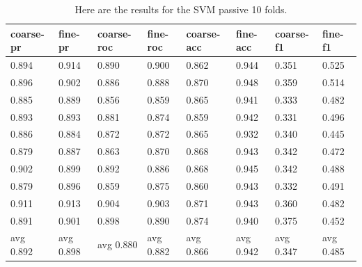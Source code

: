 \documentclass[ms]{nuthesis}
\begin{document}
\FloatBarrier
\begin{table}[H]
  \centering
  \begin{tabular}{|l||l||l||l||l||l||l||l|}\toprule
    coarse-pr & fine-pr & coarse-roc & fine-roc & coarse-acc & fine-acc & coarse-f1 & fine-f1 \\ \midrule
    0.894 & 0.914 & 0.890 & 0.900 & 0.862 & 0.944 & 0.351 & 0.525 \\
    0.896 & 0.902 & 0.886 & 0.888 & 0.870 & 0.948 & 0.359 & 0.514 \\
    0.885 & 0.889 & 0.856 & 0.859 & 0.865 & 0.941 & 0.333 & 0.482 \\
    0.893 & 0.893 & 0.881 & 0.874 & 0.859 & 0.942 & 0.331 & 0.496 \\
    0.886 & 0.884 & 0.872 & 0.872 & 0.865 & 0.932 & 0.340 & 0.445 \\
    0.879 & 0.887 & 0.863 & 0.870 & 0.868 & 0.943 & 0.342 & 0.472 \\
    0.902 & 0.899 & 0.892 & 0.886 & 0.868 & 0.945 & 0.342 & 0.488 \\
    0.879 & 0.896 & 0.859 & 0.875 & 0.860 & 0.943 & 0.332 & 0.491 \\
    0.911 & 0.913 & 0.904 & 0.903 & 0.871 & 0.943 & 0.360 & 0.482 \\
    0.891 & 0.901 & 0.898 & 0.890 & 0.874 & 0.940 & 0.375 & 0.452 \\
    avg 0.892 & avg 0.898 & avg 0.880 & avg 0.882 & avg 0.866 & avg 0.942 & avg 0.347 & avg 0.485 \\ \bottomrule
  \end{tabular}
  \caption{Here are the results for the SVM passive 10 folds.}
  \label{tab:SVM}
\end{table}
\FloatBarrier
\end{document}
